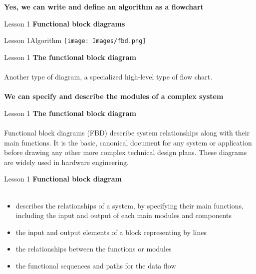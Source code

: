 \documentclass[aspectratio=1610]{beamer}
\begin{document}
\begin{frame}
\begin{center}
\Huge 
\textbf {Yes, we can write and define an algorithm as a flowchart}
\end{center}
\end{frame}


\begin{frame}{Lesson 1}{}
\LARGE
\textbf{Functional block diagrams}
\end{frame}


\begin{frame}{Lesson 1}{Algorithm}
\texttt{[image: Images/fbd.png]}
\end{frame}


\begin{frame}{Lesson 1}{}
\LARGE
\textbf{The functional block diagram}\\~\\
Another type of diagram, a specialized high-level type of flow chart.\\~\\
\textbf {We can specify and describe the modules of a complex system}
\end{frame}


\begin{frame}{Lesson 1}{}
\LARGE
\textbf{The functional block diagram}\\~\\
Functional block diagrams (FBD) describe system relationships along with their main functions. It is the basic, canonical document for any system or application before drawing any other more complex technical design plans. These diagrams are widely used in hardware engineering.
\end{frame}


\begin{frame}{Lesson 1}{}
\LARGE
\textbf{Functional block diagram}\\~\\
\begin{itemize}
	\item describes the relationships of a system, by specifying their main functions, including the input and output of each main modules and components
	\item the input and output elements of a block representing by lines
	\item the relationships between the functions or modules
	\item the functional sequences and paths for the data flow
\end{itemize}
\end{frame}
\end{document}
